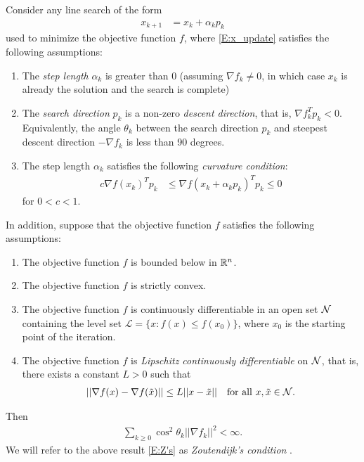 \begin{theorem} \label{Thm:Line Search}
Consider any line search of the form 
\begin{align}
	x_{k+1} &= x_k + \alpha_k p_k \label{E:x_update}
\end{align}
used to minimize the objective function $f$, where \eqref{E:x_update} satisfies the following assumptions:
\begin{enumerate}
\item The \emph{step length} $\alpha_k$ is greater than $0$ (assuming $\nabla f_k \neq 0$, in which case $x_k$ is already the solution and the search is complete)
\item The \emph{search direction} $p_k$ is a non-zero \emph{descent direction}, that is, $\nabla f_k^T p_k < 0$.  Equivalently, the angle $\theta_k$ between the search direction $p_k$ and  steepest descent direction $-\nabla f_k$ is less than 90 degrees.  
\item The step length $\alpha_k$ satisfies the following \emph{curvature condition}:
\begin{align}
	c \nabla f(x_k)^T p_k &\leq \nabla f( x_k + \alpha_k p_k)^T p_k \leq 0 \label{E:Wolfe-mod}
\end{align}
for $0 < c < 1$.
\end{enumerate}

In addition, suppose that the objective function $f$ satisfies the following assumptions:
\begin{enumerate}
	\item The objective function $f$ is bounded below in ${\mathbb R}^n$.
	\item The objective function $f$ is strictly convex.
	\item The objective function $f$ is continuously differentiable in an open set ${\mathcal N}$ containing the level set $\mathcal{L} = \{x: f(x) \leq f(x_0)\}$, where $x_0$ is the starting point of the iteration.%
	\item The objective function $f$ is \emph{Lipschitz continuously differentiable} on ${\mathcal N}$, that is, there exists a constant $L > 0$ such that
	\begin{align}
		|| \nabla f(x) - \nabla f(\tilde{x}) || \leq L || x - \tilde{x} || \quad \text{for all $x, \tilde{x} \in {\mathcal N}$}. \label{E:Lipschitz}
	\end{align} 

\end{enumerate}

Then 
\begin{align}
	\sum_{k \geq 0} \cos^2 \theta_k || \nabla f_k ||^2 < \infty. \label{E:Z's}
\end{align}
We will refer to the above result \eqref{E:Z's} as \emph{Zoutendijk's condition} \citep[p43]{NW}. 
\end{theorem}


